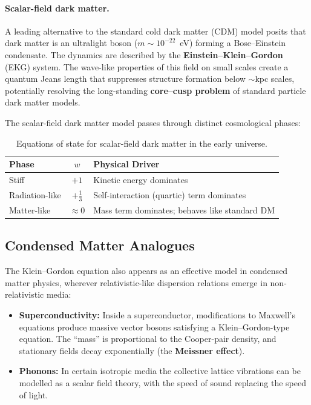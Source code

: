 \documentclass[12pt, a4paper]{article}
\theoremstyle{definition}
\begin{document}
\paragraph{Scalar-field dark matter.}
A leading alternative to the standard cold dark matter (CDM) model posits that
dark matter is an ultralight boson ($m \sim 10^{-22}$~eV) forming a
Bose--Einstein condensate.  The dynamics are described by the
\textbf{Einstein--Klein--Gordon} (EKG) system.  The wave-like properties of
this field on small scales create a quantum Jeans length that suppresses
structure formation below $\sim$kpc scales, potentially resolving the
long-standing \textbf{core--cusp problem} of standard particle dark matter
models.

The scalar-field dark matter model passes through distinct cosmological
phases:

\renewcommand{\arraystretch}{1.3}
\begin{table}[h]
\centering
\caption{Equations of state for scalar-field dark matter in the early universe.}
\begin{tabular}{@{}lcp{6.5cm}@{}}
\toprule
\textbf{Phase} & \textbf{$w$} & \textbf{Physical Driver} \\
\midrule
Stiff & $+1$ & Kinetic energy dominates \\
Radiation-like & $+\tfrac{1}{3}$ & Self-interaction (quartic) term dominates \\
Matter-like & $\approx 0$ & Mass term dominates; behaves like standard DM \\
\bottomrule
\end{tabular}
\end{table}

\subsection{Condensed Matter Analogues}

The Klein--Gordon equation also appears as an effective model in condensed
matter physics, wherever relativistic-like dispersion relations emerge in
non-relativistic media:

\begin{itemize}
    \item \textbf{Superconductivity:} Inside a superconductor, modifications
          to Maxwell's equations produce massive vector bosons satisfying a
          Klein--Gordon-type equation.  The ``mass'' is proportional to the
          Cooper-pair density, and stationary fields decay exponentially
          (the \textbf{Meissner effect}).
    \item \textbf{Phonons:} In certain isotropic media the collective lattice
          vibrations can be modelled as a scalar field theory, with the speed
          of sound replacing the speed of light.
\end{itemize}
\end{document}
